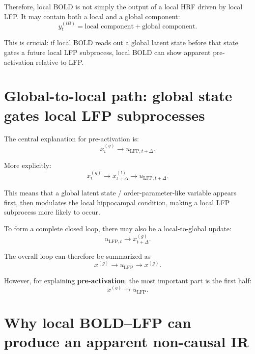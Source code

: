 \documentclass[11pt,a4paper]{article}
\begin{document}
Therefore, local BOLD is not simply the output of a local HRF driven by local LFP. It may contain both a local and a global component:
\begin{equation}
    y_t^{(lB)} = \text{local component} + \text{global component}.
\end{equation}

This is crucial: if local BOLD reads out a global latent state before that state gates a future local LFP subprocess, local BOLD can show apparent pre-activation relative to LFP.

\section{Global-to-local path: global state gates local LFP subprocesses}

The central explanation for pre-activation is:
\begin{equation}
    x_t^{(g)} \rightarrow u_{\mathrm{LFP},t+\Delta}.
\end{equation}

More explicitly:
\begin{equation}
    x_t^{(g)} \rightarrow x_{t+\Delta}^{(l)} \rightarrow u_{\mathrm{LFP},t+\Delta}.
\end{equation}

This means that a global latent state / order-parameter-like variable appears first, then modulates the local hippocampal condition, making a local LFP subprocess more likely to occur.

To form a complete closed loop, there may also be a local-to-global update:
\begin{equation}
    u_{\mathrm{LFP},t} \rightarrow x_{t+\Delta}^{(g)}.
\end{equation}

The overall loop can therefore be summarized as
\begin{equation}
    x^{(g)} \rightarrow u_{\mathrm{LFP}} \rightarrow x^{(g)}.
\end{equation}

However, for explaining \textbf{pre-activation}, the most important part is the first half:
\begin{equation}
    x^{(g)} \rightarrow u_{\mathrm{LFP}}.
\end{equation}

\section{Why local BOLD--LFP can produce an apparent non-causal IR}
\end{document}
